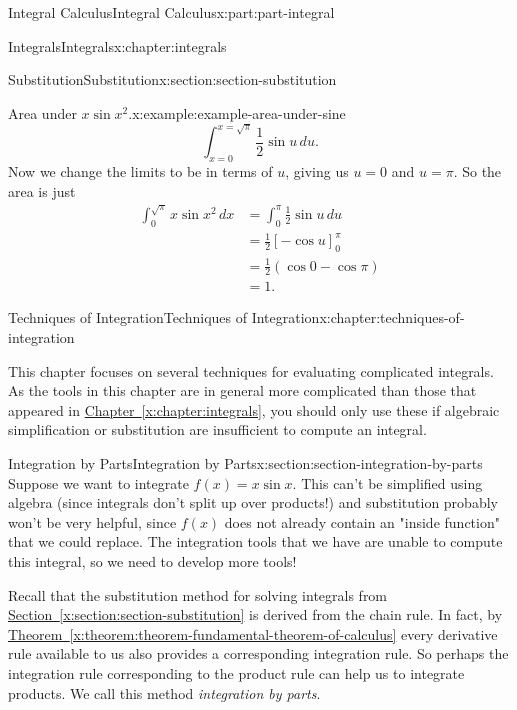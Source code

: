 \documentclass[twoside,10pt,]{book}
\newcommand{\xreffont}{\relax}
\numberwithin{equation}{part}
\begin{document}
\begin{partptx}{Integral Calculus}{}{Integral Calculus}{}{}{x:part:part-integral}
\begin{chapterptx}{Integrals}{}{Integrals}{}{}{x:chapter:integrals}
\begin{sectionptx}{Substitution}{}{Substitution}{}{}{x:section:section-substitution}
\begin{example}{Area under \(x\sin x^{2}\).}{x:example:example-area-under-sine}
\begin{equation*}
\int_{x=0}^{x=\sqrt{\pi}}\frac{1}{2}\sin u\,du.
\end{equation*}
Now we change the limits to be in terms of \(u\), giving us \(u = 0\) and \(u = \pi\). So the area is just%
\begin{align*}
\int_{0}^{\sqrt{\pi}}x\sin x^{2}\,dx & = \int_{0}^{\pi}\frac{1}{2}\sin u\,du \\
& = \frac{1}{2}[-\cos u]_{0}^{\pi} \\
& = \frac{1}{2}(\cos0 - \cos\pi) \\
& = 1. 
\end{align*}
%
\end{example}
\end{sectionptx}
\end{chapterptx}
%
\typeout{************************************************}
\typeout{************************************************}
%
\begin{chapterptx}{Techniques of Integration}{}{Techniques of Integration}{}{}{x:chapter:techniques-of-integration}
\begin{introduction}{}%
This chapter focuses on several techniques for evaluating complicated integrals. As the tools in this chapter are in general more complicated than those that appeared in \hyperref[x:chapter:integrals]{Chapter~{\xreffont\ref{x:chapter:integrals}}}, you should only use these if algebraic simplification or substitution are insufficient to compute an integral.%
\end{introduction}%
%
%
\typeout{************************************************}
\typeout{************************************************}
%
\begin{sectionptx}{Integration by Parts}{}{Integration by Parts}{}{}{x:section:section-integration-by-parts}
Suppose we want to integrate \(f(x) = x\sin x\). This can't be simplified using algebra (since integrals don't split up over products!) and substitution probably won't be very helpful, since \(f(x)\) does not already contain an "inside function" that we could replace. The integration tools that we have are unable to compute this integral, so we need to develop more tools!%
\par
Recall that the substitution method for solving integrals from \hyperref[x:section:section-substitution]{Section~{\xreffont\ref{x:section:section-substitution}}} is derived from the chain rule. In fact, by \hyperref[x:theorem:theorem-fundamental-theorem-of-calculus]{Theorem~{\xreffont\ref{x:theorem:theorem-fundamental-theorem-of-calculus}}} every derivative rule available to us also provides a corresponding integration rule. So perhaps the integration rule corresponding to the product rule can help us to integrate products. We call this method \emph{integration by parts}.%

\end{sectionptx}
\end{chapterptx}
\end{partptx}
\end{document}
